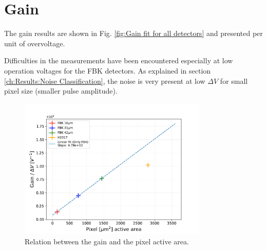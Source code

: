 \section{Gain}
\label{ch:Results:Gain}


The gain results are shown in Fig. \ref{fig:Gain fit for all detectors} and presented per unit of overvoltage.

Difficulties in the measurements have been encountered especially at low operation voltages for the FBK detectors. As explained in section \ref{ch:Results:Noise Classification}, the noise is very present at low $\Delta V$ for small pixel size (smaller pulse amplitude). 

\begin{figure}[htbp]
    \centering
    \includegraphics[width=0.8\textwidth]{gfx/plots/Gain/Gain(pixel size)_area.pdf}
    \caption{Relation between the gain and the pixel active area.}
    \label{fig:gain(area)}
\end{figure}


